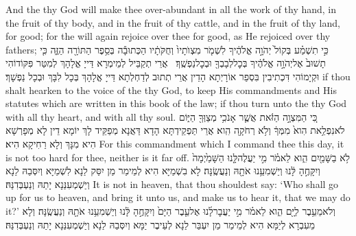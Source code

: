 {And the \lord\space thy God will make thee over-abundant in all the work of thy hand, in the fruit of thy body, and in the fruit of thy cattle, and in the fruit of thy land, for good; for the \lord\space will again rejoice over thee for good, as He rejoiced over thy fathers;}{}
{כִּ֣י תִשְׁמַ֗ע בְּקוֹל֙ יְהֹוָ֣ה אֱלֹהֶ֔יךָ לִשְׁמֹ֤ר מִצְוֺתָיו֙ וְחֻקֹּתָ֔יו הַכְּתוּבָ֕ה בְּסֵ֥פֶר הַתּוֹרָ֖ה הַזֶּ֑ה כִּ֤י תָשׁוּב֙ אֶל\maqqaf יְהֹוָ֣ה אֱלֹהֶ֔יךָ בְּכׇל\maqqaf לְבָבְךָ֖ וּבְכׇל\maqqaf נַפְשֶֽׁךָ׃ \setuma }
{אֲרֵי תְקַבֵּיל לְמֵימְרָא דַּייָ אֱלָהָךְ לְמִטַּר פִּקּוֹדוֹהִי וּקְיָמוֹהִי דִּכְתִיבִין בִּסְפַר אוֹרָיְתָא הָדֵין אֲרֵי תְתוּב לְדַחְלְתָא דַּייָ אֱלָהָךְ בְּכָל לִבָּךְ וּבְכָל נַפְשָׁךְ׃}
{if thou shalt hearken to the voice of the \lord\space thy God, to keep His commandments and His statutes which are written in this book of the law; if thou turn unto the \lord\space thy God with all thy heart, and with all thy soul.}{}
\newseder
{}%
{כִּ֚י הַמִּצְוָ֣ה הַזֹּ֔את אֲשֶׁ֛ר אָנֹכִ֥י מְצַוְּךָ֖ הַיּ֑וֹם לֹא\maqqaf נִפְלֵ֥את הִוא֙ מִמְּךָ֔ וְלֹ֥א רְחֹקָ֖ה הִֽוא׃}
{אֲרֵי תַּפְקֵידְתָּא הָדָא דַּאֲנָא מְפַקֵּיד לָךְ יוֹמָא דֵין לָא מְפָרְשָׁא הִיא מִנָּךְ וְלָא רַחִיקָא הִיא׃}
{For this commandment which I command thee this day, it is not too hard for thee, neither is it far off.}{}
{לֹ֥א בַשָּׁמַ֖יִם הִ֑וא לֵאמֹ֗ר מִ֣י יַעֲלֶה\maqqaf לָּ֤נוּ הַשָּׁמַ֙יְמָה֙ וְיִקָּחֶ֣הָ לָּ֔נוּ וְיַשְׁמִעֵ֥נוּ אֹתָ֖הּ וְנַעֲשֶֽׂנָּה׃}
{לָא בִשְׁמַיָּא הִיא לְמֵימַר מַן יִסַּק לַנָא לִשְׁמַיָּא וְיִסְּבַהּ לַנָא וְיַשְׁמְעִנַּנָא יָתַהּ וְנַעְבְּדִנַּהּ׃}
{It is not in heaven, that thou shouldest say: ‘Who shall go up for us to heaven, and bring it unto us, and make us to hear it, that we may do it?’}{}
{וְלֹא\maqqaf מֵעֵ֥בֶר לַיָּ֖ם הִ֑וא לֵאמֹ֗ר מִ֣י יַעֲבׇר\maqqaf לָ֜נוּ אֶל\maqqaf עֵ֤בֶר הַיָּם֙ וְיִקָּחֶ֣הָ לָּ֔נוּ וְיַשְׁמִעֵ֥נוּ אֹתָ֖הּ וְנַעֲשֶֽׂנָּה׃}
{וְלָא מֵעִבְרָא לְיַמָּא הִיא לְמֵימַר מַן יִעְבַּר לַנָא לְעֵיבֶר יַמָּא וְיִסְּבַהּ לַנָא וְיַשְׁמְעִנַּנָא יָתַהּ וְנַעְבְּדִנַּהּ׃}
